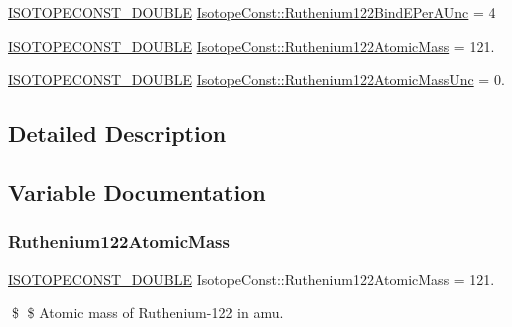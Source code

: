 \begin{DoxyCompactItemize}
\mbox{\hyperlink{group___isotope_const-_macros_ga8f45a7272ce02c0b4c65c44636ed719a}{I\+S\+O\+T\+O\+P\+E\+C\+O\+N\+S\+T\+\_\+\+D\+O\+U\+B\+LE}} \mbox{\hyperlink{group___isotope_const-_ruthenium-_ru122_gacba11c1cc3d0409a47c967640eef67bc}{Isotope\+Const\+::\+Ruthenium122\+Bind\+E\+Per\+A\+Unc}} = 4
\item 
\mbox{\hyperlink{group___isotope_const-_macros_ga8f45a7272ce02c0b4c65c44636ed719a}{I\+S\+O\+T\+O\+P\+E\+C\+O\+N\+S\+T\+\_\+\+D\+O\+U\+B\+LE}} \mbox{\hyperlink{group___isotope_const-_ruthenium-_ru122_ga3f6a0282700fa0c71a66007024f50804}{Isotope\+Const\+::\+Ruthenium122\+Atomic\+Mass}} = 121.
\item 
\mbox{\hyperlink{group___isotope_const-_macros_ga8f45a7272ce02c0b4c65c44636ed719a}{I\+S\+O\+T\+O\+P\+E\+C\+O\+N\+S\+T\+\_\+\+D\+O\+U\+B\+LE}} \mbox{\hyperlink{group___isotope_const-_ruthenium-_ru122_ga0d7d6cd63bc4c6c151c2dd394fa89193}{Isotope\+Const\+::\+Ruthenium122\+Atomic\+Mass\+Unc}} = 0.
\end{DoxyCompactItemize}


\subsection{Detailed Description}


\subsection{Variable Documentation}
\mbox{\label{group___isotope_const-_ruthenium-_ru122_ga3f6a0282700fa0c71a66007024f50804}} 
\subsubsection{\texorpdfstring{Ruthenium122\+Atomic\+Mass}{Ruthenium122AtomicMass}}
{\footnotesize\ttfamily \mbox{\hyperlink{group___isotope_const-_macros_ga8f45a7272ce02c0b4c65c44636ed719a}{I\+S\+O\+T\+O\+P\+E\+C\+O\+N\+S\+T\+\_\+\+D\+O\+U\+B\+LE}} Isotope\+Const\+::\+Ruthenium122\+Atomic\+Mass = 121.}

\$ \$ Atomic mass of Ruthenium-\/122 in amu. \mbox{\label{group___isotope_const-_ruthenium-_ru122_ga0d7d6cd63bc4c6c151c2dd394fa89193}} 
